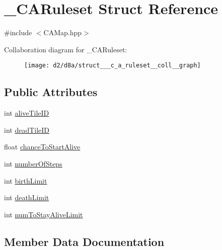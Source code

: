 \hypertarget{struct___c_a_ruleset}{}\section{\+\_\+\+C\+A\+Ruleset Struct Reference}
\label{struct___c_a_ruleset}


{\ttfamily \#include $<$C\+A\+Map.\+hpp$>$}



Collaboration diagram for \+\_\+\+C\+A\+Ruleset\+:
\nopagebreak
\begin{figure}[H]
\begin{center}
\leavevmode
\texttt{[image: d2/d8a/struct\_\_\_c\_a\_ruleset\_\_coll\_\_graph]}
\end{center}
\end{figure}
\subsection*{Public Attributes}
\begin{DoxyCompactItemize}
\item 
int \mbox{\hyperlink{struct___c_a_ruleset_a337222bac7553157120b52380f58d570}{alive\+Tile\+ID}}
\item 
int \mbox{\hyperlink{struct___c_a_ruleset_a6d57373433d4eb5236bbeac8bb6f464f}{dead\+Tile\+ID}}
\item 
float \mbox{\hyperlink{struct___c_a_ruleset_afeb8028018113d49b14b5e19f7287d76}{chance\+To\+Start\+Alive}}
\item 
int \mbox{\hyperlink{struct___c_a_ruleset_ac2f4cb85d2b3e775e33eaed281a92b2d}{number\+Of\+Steps}}
\item 
int \mbox{\hyperlink{struct___c_a_ruleset_ab00fdee694e9ffe768885de7e5deb47e}{birth\+Limit}}
\item 
int \mbox{\hyperlink{struct___c_a_ruleset_a421ce30ec54473bec500e3374911637c}{death\+Limit}}
\item 
int \mbox{\hyperlink{struct___c_a_ruleset_a8af594e5e229ec31c0ef86b9bf214401}{num\+To\+Stay\+Alive\+Limit}}
\end{DoxyCompactItemize}


\subsection{Member Data Documentation}
\mbox{\label{struct___c_a_ruleset_a337222bac7553157120b52380f58d570}} 
